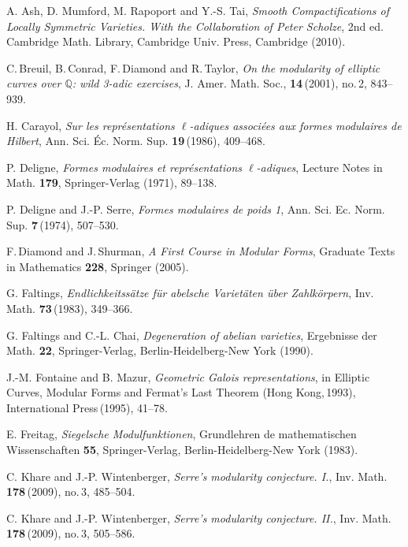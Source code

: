 \documentclass[11pt]{amsart}
\begin{document}
\vskip 5mm
\begin{thebibliography}{99}

 A. Ash, D. Mumford, M. Rapoport and Y.-S. Tai, {\em Smooth Compactifications of Locally Symmetric Varieties. With the Collaboration of Peter Scholze}, 2nd ed. Cambridge Math. Library, Cambridge Univ. Press, Cambridge (2010).

 C.\,Breuil, B.\,Conrad, F.\,Diamond and R.\,Taylor,
{\em On the modularity of elliptic curves over $\mathbb Q$: wild 3-adic exercises},
J. Amer. Math. Soc., {\bf 14}\,(2001), no.\,2, 843--939.

 H. Carayol, {\em Sur les repr{\' e}sentations $\ell$-adiques
associ{\'e}es aux formes modulaires de Hilbert}, Ann. Sci. {\'E}c. Norm. Sup.
{\bf 19}\,(1986), 409--468.

 P. Deligne, {\em Formes modulaires et repr{\' e}sentations $\ell$-adiques},
Lecture Notes in Math. {\bf 179}, Springer-Verlag (1971), 89--138.

 P. Deligne and J.-P. Serre, {\em Formes modulaires de poids 1},
Ann. Sci. Ec. Norm. Sup. {\bf 7}\,(1974), 507--530.

 F.\,Diamond and J.\,Shurman, {\em A First Course in Modular Forms},
Graduate Texts in Mathematics {\bf 228}, Springer (2005).

 G. Faltings, {\em Endlichkeitss{\"a}tze f{\"u}r abelsche Variet{\"a}ten
{\" u}ber Zahlk{\"o}rpern}, Inv. Math. {\bf 73}\,(1983), 349--366.

 G. Faltings and C.-L. Chai, {\em Degeneration of abelian varieties}, Ergebnisse der Math.
{\bf 22}, Springer-Verlag, Berlin-Heidelberg-New York (1990).

 J.-M. Fontaine and B. Mazur, {\em Geometric Galois representations},
in Elliptic Curves, Modular Forms and Fermat's Last Theorem (Hong Kong,\,1993),
International Press\,(1995), 41--78.

 E. Freitag, {\em Siegelsche Modulfunktionen}, Grundlehren de mathematischen Wissenschaften {\bf 55}, Springer-Verlag, Berlin-Heidelberg-New York (1983).

 C. Khare and J.-P. Wintenberger, {\em Serre's modularity conjecture. I.},
Inv. Math. {\bf 178}\,(2009), no.\,3, 485--504.

 C. Khare and J.-P. Wintenberger, {\em Serre's modularity conjecture. II.},
Inv. Math. {\bf 178}\,(2009), no.\,3, 505--586.


\end{thebibliography}
\end{document}
